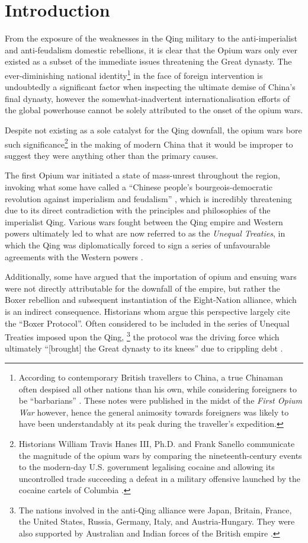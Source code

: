\documentclass{article}
\begin{document}
\section{Introduction}

From the exposure of the weaknesses in the Qing military to the anti-imperialist and anti-feudalism domestic rebellions, it is clear that the Opium wars only ever existed as a subset of the immediate issues threatening the Great dynasty. The ever-diminishing national identity\footnote{According to contemporary British travellers to China, a true Chinaman often despised all other nations than his own, while considering foreigners to be ``barbarians''
\autocite{McPherson:1842}. These notes were published in the midst of the \textit{First Opium War} however, hence the general animosity towards foreigners was likely to have been understandably at its peak during the traveller's expedition.} in the face of foreign intervention is undoubtedly a significant factor when inspecting the ultimate demise of China's final dynasty, however the somewhat-inadvertent internationalisation efforts of the global powerhouse cannot be solely attributed to the onset of the opium wars.

Despite not existing as a sole catalyst for the Qing downfall, the opium wars bore such significance\footnote{Historians William Travis Hanes III, Ph.D. and Frank Sanello communicate the magnitude of the opium wars by comparing the nineteenth-century events to the modern-day U.S. government legalising cocaine and allowing its uncontrolled trade succeeding a defeat in a military offensive launched by the cocaine cartels of Columbia
\autocite{Hanes:2004}.} in the making of modern China that it would be improper to suggest they were anything other than the primary causes.

The first Opium war initiated a state of mass-unrest throughout the region, invoking what some have called a ``Chinese people's bourgeois-democratic revolution against imperialism and feudalism''
\autocite{Janin:1999}, which is incredibly threatening due to its direct contradiction with the principles and philosophies of the imperialist Qing. Various wars fought between the Qing empire and Western powers ultimately led to what are now referred to as the \textit{Unequal Treaties}, in which the Qing was diplomatically forced to sign a series of unfavourable agreements with the Western powers \autocite{Wang:2005}.

Additionally, some have argued that the importation of opium and ensuing wars were not directly attributable for the downfall of the empire, but rather the Boxer rebellion and subsequent instantiation of the Eight-Nation alliance, which is an indirect consequence. Historians whom argue this perspective largely cite the ``Boxer Protocol''. Often considered to be included in the series of Unequal Treaties imposed upon the Qing, \footnote{The nations involved in the anti-Qing alliance were Japan, Britain, France, the United States, Russia, Germany, Italy, and Austria-Hungary. They were also supported by Australian and Indian forces of the British empire
\autocite{Gardener:2016}.} the protocol was the driving force which ultimately ``[brought] the Great dynasty to its knees'' due to crippling debt \autocite{Mitchell:2008}.
\end{document}
